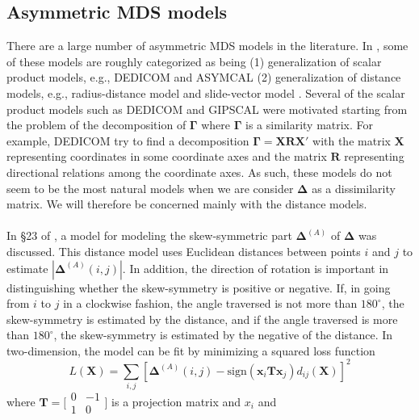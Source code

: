 \subsection{Asymmetric MDS models}
\label{sec:asymm-mds-models}
There are a large number of asymmetric MDS models in the
literature. In \citet{saito05:_data_analy_asymm_struc}, some of these
models are roughly categorized as being (1) generalization of scalar
product models, e.g., DEDICOM \citep{harshman78:_model_n} and ASYMCAL
\citep{chino78:_n} (2) generalization of distance models, e.g.,
radius-distance model \citep{okada87:_geomet} and slide-vector model
\citep{zielmand93:_analy,leeuw82:_handb}. Several of the scalar
product models such as DEDICOM and GIPSCAL were motivated starting
from the problem of the decomposition of $\bm{\Gamma}$ where
$\bm{\Gamma}$ is a similarity matrix. For example, DEDICOM try to find
a decomposition $\bm{\Gamma} = \mathbf{X} \mathbf{R} \mathbf{X}'$ with
the matrix $\mathbf{X}$ representing coordinates in some coordinate
axes and the matrix $\mathbf{R}$ representing directional relations
among the coordinate axes. As such, these models do not seem to be the
most natural models when we are consider $\bm{\Delta}$ as a
dissimilarity matrix. We will therefore be concerned mainly with the
distance models. \\ \\
%
\noindent In \S 23 of \citet{borg05:_moder}, a model for modeling the
skew-symmetric part $\bm{\Delta}^{(A)}$ of $\bm{\Delta}$ was
discussed. This distance model uses Euclidean distances between points
$i$ and $j$ to estimate $| \bm{\Delta}^{(A)}(i,j)|$. In addition, the
direction of rotation is important in distinguishing whether the
skew-symmetry is positive or negative. If, in going from  $i$ to $j$
in a clockwise fashion, the angle traversed is not more than $180^\circ$,
the skew-symmetry is estimated by the distance, and if the angle
traversed is more than $180^\circ$, the skew-symmetry is estimated by
the negative of the distance. In two-dimension, the model can be fit by minimizing a
squared loss function 
\begin{equation}
  \label{eq:109}
  L(\mathbf{X}) = \sum_{i,j}[\bm{\Delta}^{(A)}(i,j) -
  \mathrm{sign}(\mathbf{x}_i \mathbf{T} \mathbf{x}_j)
  d_{ij}(\mathbf{X})]^2
\end{equation}
where $\mathbf{T} = \bigl[ \begin{smallmatrix} 0 & -1 \\ 1 &
  0 \end{smallmatrix} \bigr]$ is a projection matrix and $x_i$ and

